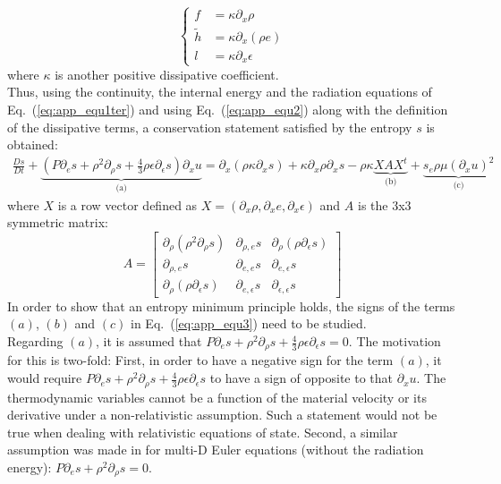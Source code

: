 \documentclass[review]{elsarticle}
\newcommand{\eqt}[1]{Eq.~(\ref{#1})}                     %
\begin{document}
\begin{appendices}
\begin{equation}
 \left\{
 \begin{array}{ccc}
f &= \kappa \partial_x \rho \\
\tilde{h} &= \kappa \partial_x (\rho e) \\
l &= \kappa \partial_x \epsilon
 \end{array}
 \right.
 \end{equation}
 where $\kappa$ is another positive dissipative coefficient. \\
 Thus, using the continuity, the internal energy and the radiation equations of \eqt{eq:app_equ1ter} and using \eqt{eq:app_equ2} along with the definition of the dissipative terms, a conservation statement satisfied by the entropy $s$ is obtained:
 \begin{eqnarray}
 \label{eq:app_equ3}
 \frac{Ds}{Dt} + \underbrace{\left( P \partial_e s + \rho^2 \partial_{\rho} s + \frac{4}{3} \rho \epsilon \partial_{\epsilon} s \right) \partial_x u}_\textrm{(a)} = \partial_x \left( \rho \kappa \partial_x s \right) + \kappa \partial_x \rho \partial_x s - \rho \kappa \underbrace{X A X^t}_\textrm{(b)} + \underbrace{ s_e \rho \mu (\partial_x u)^2}_\textrm{(c)}
 \end{eqnarray}
 where $X$ is a row vector defined as $X=\left( \partial_x \rho, \partial_x e, \partial_x \epsilon \right)$ and $A$ is the $3$x$3$ symmetric matrix:
 \begin{equation}
 A = 
 \left[
 \begin{array}{ccc}
\partial_{\rho} \left( \rho^2 \partial_{\rho} s \right) & \partial_{\rho,e} s & \partial_{\rho} \left( \rho \partial_{\epsilon} s \right) \\
 \partial_{\rho,e} s & \partial_{e,e} s & \partial_{e,\epsilon} s \\
 \partial_{\rho} \left( \rho \partial_{\epsilon} s \right) & \partial_{e,\epsilon} s & \partial_{\epsilon,\epsilon} s
 \end{array}
 \right]
 \end{equation}
 In order to show that an entropy minimum principle holds, the signs of the terms $(a)$, $(b)$ and $(c)$ in \eqt{eq:app_equ3} need to be studied.\\
Regarding $(a)$, it is assumed that $P \partial_e s + \rho^2 \partial_{\rho} s + \frac{4}{3} \rho \epsilon \partial_{\epsilon} s=0$. The motivation for this is two-fold: First, in order to have a negative sign for the term $(a)$, it would require $P \partial_e s + \rho^2 \partial_{\rho} s + \frac{4}{3} \rho \epsilon \partial_{\epsilon} s$ to have a sign of opposite to that $\partial_x u$. The thermodynamic variables cannot be a function of the material velocity or its derivative under a non-relativistic assumption. Such a statement would not be true when dealing with relativistic equations of state. Second, a similar assumption was made in \cite{jlg} for multi-D Euler equations (without the radiation energy): $P \partial_e s + \rho^2 \partial_{\rho} s = 0$.\\

\end{appendices}
\end{document}
